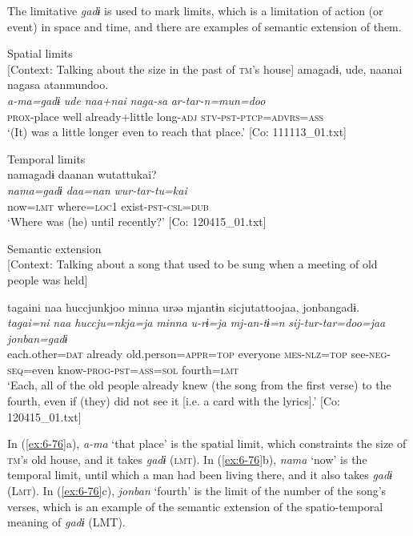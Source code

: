 The limitative \textit{gadɨ} is used to mark limits, which is a limitation of action (or event) in space and time, and there are examples of semantic extension of them.

\ea\label{ex:6-76}
\ea Spatial limits\\
  {}[Context: Talking about the size in the past of \textsc{tm}’s house]
{\TM}
\glll amagadɨ,  ude,  naanai  nagasa  atanmundoo.\\
\textit{a-ma=gadɨ}  \textit{ude}  \textit{naa+nai}  \textit{naga-sa}  \textit{ar-tar-n=mun=doo}\\
    \textsc{prox}-place  well  already+little  long-\textsc{adj}  \textsc{stv}-\textsc{pst}-\textsc{ptcp}=\textsc{advrs}=\textsc{ass}\\
\glt    ‘(It) was a little longer even to reach that place.’ [Co: 111113\_01.txt]

\ex Temporal limits\\
{\TM}
\glll namagadɨ  daanan  wutattukai?\\
\textit{nama=gadɨ}  \textit{daa=nan}  \textit{wur-tar-tu=kai}\\
    now=\textsc{lmt}  where=\textsc{loc1}  exist-\textsc{pst}-\textsc{csl}=\textsc{dub}\\
\glt    ‘Where was (he) until recently?’ [Co: 120415\_01.txt]

\ex Semantic extension\\
  {}[Context: Talking about a song that used to be sung when a meeting of old people was held]

{\TM}
\glll {\textbar}tagaini{\textbar}  naa  huccjunkjoo  minna    urəə  mjantɨn  sicjutattoojaa,    {\textbar}jonban{\textbar}gadɨ.\\
\textit{tagai=ni}  \textit{naa}  \textit{huccju=nkja=ja}  \textit{minna}  \textit{u-rɨ=ja}  \textit{mj-an-tɨ=n}  \textit{sij-tur-tar=doo=jaa}    \textit{jonban=gadɨ}\\
    each.other=\textsc{dat}  already  old.person=\textsc{appr}=\textsc{top}  everyone    \textsc{mes}-\textsc{nlz}=\textsc{top}  see-\textsc{neg}-\textsc{seq}=even  know-\textsc{prog}-\textsc{pst}=\textsc{ass}=\textsc{sol} fourth=\textsc{lmt}\\
\glt    ‘Each, all of the old people already knew (the song from the first verse) to the fourth, even if (they) did not see it [i.e. a card with the lyrics].’ [Co: 120415\_01.txt]
\z
\z

In (\ref{ex:6-76}a), \textit{a-ma} ‘that place’ is the spatial limit, which constraints the size of \textsc{tm}’s old house, and it takes \textit{gadɨ} (\textsc{lmt}). In (\ref{ex:6-76}b), \textit{nama} ‘now’ is the temporal limit, until which a man had been living there, and it also takes \textit{gadɨ} (L\textsc{mt}). In (\ref{ex:6-76}c), \textit{jonban} ‘fourth’ is the limit of the number of the song’s verses, which is an example of the semantic extension of the spatio-temporal meaning of \textit{gadɨ} (LMT).

